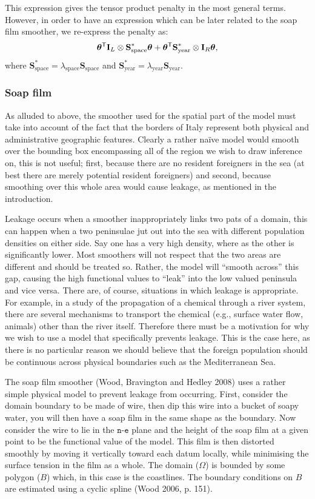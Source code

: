 \documentclass[10pt] {article}
\newcommand{\ts}{^{\sf T}}
\theoremstyle{definition}
\theoremstyle{plain}
\begin{document}
This expression gives the tensor product penalty in the most general terms. However, in order to have an expression which can be later related to the soap film smoother, we re-express the penalty as:
$$
\bm\theta\ts \textbf{I}_L \otimes \textbf{S}^*_\text{space} \bm\theta + \bm\theta\ts \textbf{S}^*_\text{year} \otimes \textbf{I}_R  \bm\theta,
$$
where $\textbf{S}^*_\text{space}=\lambda_\text{space} \textbf{S}_\text{space}$ and $\textbf{S}^*_\text{year}=\lambda_\text{year} \textbf{S}_\text{year}$.


\subsubsection{Soap film \label{SF}}

As alluded to above, the smoother used for the spatial part of the model must take into account of the fact that the borders of Italy represent both physical and administrative geographic features. Clearly a rather na\"ive model would smooth over the bounding box encompassing all of the region we wish to draw inference on, this is not useful; first, because there are no resident foreigners in the sea (at best there are merely potential resident foreigners) and second, because smoothing over this whole area would cause leakage, as mentioned in the introduction.

Leakage occurs when a smoother inappropriately links two pats of a domain, this can happen when a two peninsulae jut out into the sea with different population densities on either side. Say one has a very high density, where as the other is significantly lower. Most smoothers will not respect that the two areas are different and should be treated so. Rather, the model will ``smooth across'' this gap, causing the high functional values to ``leak'' into the low valued peninsula and vice versa. There are, of course, situations in which leakage is appropriate. For example, in a study of the propagation of a chemical through a river system, there are several mechanisms to transport the chemical (e.g., surface water flow, animals) other than the river itself. Therefore there must be a motivation for why we wish to use a model that specifically prevents leakage. This is the case here, as there is no particular reason we should believe that the foreign population should be continuous across physical boundaries such as the Mediterranean Sea.

The soap film smoother (Wood, Bravington and Hedley 2008) uses a rather simple physical model to prevent leakage from occurring. First, consider the domain boundary to be made of wire, then dip this wire into a bucket of soapy water, you will then have a soap film in the same shape as the boundary. Now consider the wire to lie in the $\texttt{n}$-$\texttt{e}$ plane and the height of the soap film at a given point to be the functional value of the model. This film is then distorted smoothly by moving it vertically toward each datum locally, while minimising the surface tension in the film as a whole. The domain ($\Omega$) is bounded by some polygon ($B$) which, in this case is the coastlines. The boundary conditions on $B$ are estimated using a cyclic spline (Wood 2006, p. 151).
\end{document}
